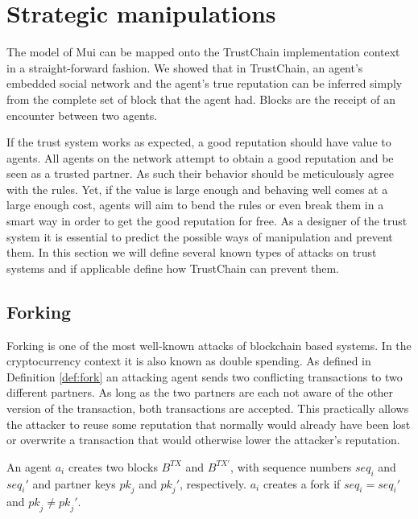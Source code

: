 \section{Strategic manipulations}
\label{sec:manipulations}
The model of Mui can be mapped onto the TrustChain implementation context in a straight-forward 
fashion. We showed that in TrustChain, an agent's embedded social network 
and the agent's true reputation can be inferred simply from the complete set of block that 
the agent had. Blocks are the receipt of an encounter between two agents. 

If the trust system works as expected, a good reputation should have value to agents. All agents on 
the network attempt to obtain a good reputation and be seen as a trusted partner. As such their 
behavior should be meticulously agree with the rules. Yet, if the value is large enough and behaving
well comes at a large enough cost, agents will aim to bend the rules or even break them in a smart 
way in order to get the good reputation for free. As a designer of the trust system it is essential
to predict the possible ways of manipulation and prevent them. In this section we will define several
known types of attacks on trust systems and if applicable define how TrustChain can prevent them.

\subsection{Forking}
Forking is one of the most well-known attacks of blockchain based systems. In the cryptocurrency 
context it is also known as double spending. As defined in Definition \ref{def:fork} an attacking agent 
sends two conflicting transactions to two different partners. As long as the two partners are each not 
aware of the other version of the transaction, both transactions are accepted. This practically 
allows the attacker to reuse some reputation that normally would already have been lost or overwrite
a transaction that would otherwise lower the attacker's reputation.

\begin{defn}[Fork]
    \label{def:fork}
    An agent $a_i$ creates two blocks $B^{TX}$ and $B^{TX'}$, with sequence numbers $\textit{seq}_i$
    and $\textit{seq}_i'$ and partner keys $\textit{pk}_j$ and $\textit{pk}_j'$, respectively. $a_i$
    creates a fork if $\textit{seq}_i = \textit{seq}_i'$ and $\textit{pk}_j \neq \textit{pk}_j'$.
\end{defn}

